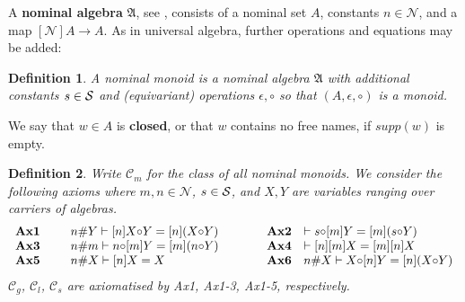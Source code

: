 \documentclass[runningheads,a4paper]{llncs}
\newcommand{\emptystr}{\epsilon}
\newcommand{\supp}{\mathit{supp}}
\newcommand{\names}{\mbox{$\mathcal{N}$}}
\newtheorem{definition}{Theorem}[section]
\newtheorem{definition}{Definition}[section]
\begin{document}
A \textbf{nominal algebra} $\mathfrak{A}$, see \cite[Def
4.13]{gabb-math:nom-alg}, consists of a nominal set $A$, constants
$n\in\names$, and a map $[\names]A\to A$. As in universal algebra,
further operations and equations may be added:
\begin{definition}
  A \emph{nominal monoid} is a nominal algebra $\mathfrak{A}$ with
  additional constants $s\in\mathcal{S}$ and (equivariant) operations
  $\emptystr,\circ$ so that $(A,\emptystr,\circ)$ is a monoid.
\end{definition}
We say that $w\in A$ is \textbf{closed}, or that $w$ contains no free
names, if $\supp(w)$ is empty. 
\begin{definition}
  Write $\mathcal{C}_m$ for the class of all nominal monoids.  We
  consider the following axioms where $m,n\in\names$, $s\in\mathcal{S}$,
  and $X,Y$ are variables ranging over carriers of algebras.
  \begin{equation*}
    \begin{array}{llcll}
\textbf{Ax1 \quad} & n\# Y \vdash [n]X{\circ}Y = [n](X{\circ}Y) 
&\quad\quad&
\textbf{Ax2} & \vdash s{\circ}[m]Y = [m](s{\circ}Y) \\
\textbf{Ax3} & n\# m \vdash n{\circ}[m]Y = [m](n{\circ}Y)
&&
\textbf{Ax4} & \vdash [n][m]X = [m][n]X \\
\textbf{Ax5} & n\# X \vdash [n]X = X
&&
\textbf{Ax6} & n\# X \vdash X{\circ}[n]Y = [n](X{\circ}Y)
    \end{array}
  \end{equation*}     
  $\mathcal{C}_{g}$,
  $\mathcal{C}_l$, $\mathcal{C}_s$ are axiomatised by Ax1, Ax1-3,
  Ax1-5, respectively.
\end{definition}
\end{document}
